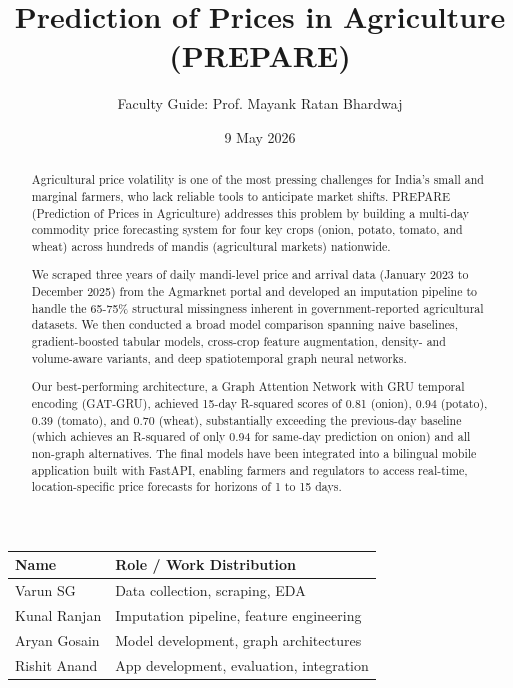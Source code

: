 \documentclass[12pt]{article}
\title{Prediction of Prices in Agriculture (PREPARE)}
\author{
Faculty Guide: Prof. Mayank Ratan Bhardwaj
}
\date{9 May 2026}
\begin{document}
\maketitle

\begin{table}[H]
\centering
\begin{tabularx}{\textwidth}{|>{\raggedright\arraybackslash}X|>{\raggedright\arraybackslash}X|}
\hline
Name & Role / Work Distribution \\
\hline
Varun SG & Data collection, scraping, EDA \\
\hline
Kunal Ranjan & Imputation pipeline, feature engineering \\
\hline
Aryan Gosain & Model development, graph architectures \\
\hline
Rishit Anand & App development, evaluation, integration \\
\hline
\end{tabularx}
\end{table}

\begin{abstract}

Agricultural price volatility is one of the most pressing challenges for India's small and marginal farmers, who lack reliable tools to anticipate market shifts. PREPARE (Prediction of Prices in Agriculture) addresses this problem by building a multi-day commodity price forecasting system for four key crops (onion, potato, tomato, and wheat) across hundreds of mandis (agricultural markets) nationwide.

We scraped three years of daily mandi-level price and arrival data (January 2023 to December 2025) from the Agmarknet portal and developed an imputation pipeline to handle the 65-75\% structural missingness inherent in government-reported agricultural datasets. We then conducted a broad model comparison spanning naive baselines, gradient-boosted tabular models, cross-crop feature augmentation, density- and volume-aware variants, and deep spatiotemporal graph neural networks.

Our best-performing architecture, a Graph Attention Network with GRU temporal encoding (GAT-GRU), achieved 15-day R-squared scores of 0.81 (onion), 0.94 (potato), 0.39 (tomato), and 0.70 (wheat), substantially exceeding the previous-day baseline (which achieves an R-squared of only 0.94 for same-day prediction on onion) and all non-graph alternatives. The final models have been integrated into a bilingual mobile application built with FastAPI, enabling farmers and regulators to access real-time, location-specific price forecasts for horizons of 1 to 15 days.

\end{abstract}
\end{document}
